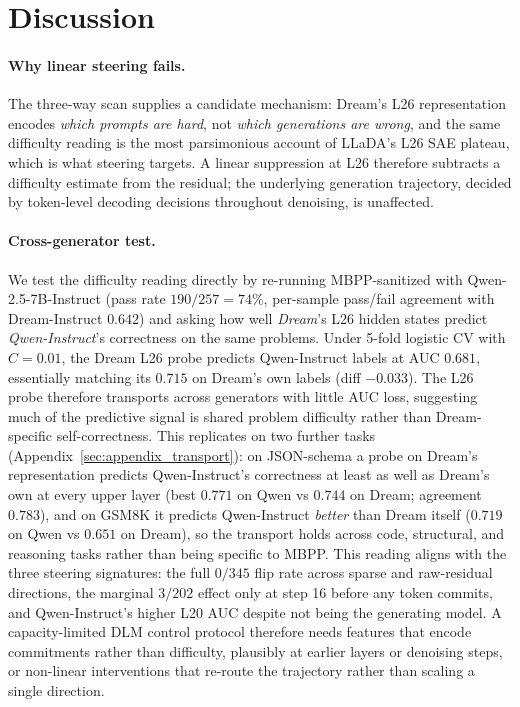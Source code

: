 \documentclass[11pt]{article}
\begin{document}
\section{Discussion}

\paragraph{Why linear steering fails.}
\label{sec:why_steer_fails}
The three-way scan supplies a candidate mechanism: Dream's L26 representation encodes \emph{which prompts are hard}, not \emph{which generations are wrong}, and the same difficulty reading is the most parsimonious account of LLaDA's L26 SAE plateau, which is what steering targets.
A linear suppression at L26 therefore subtracts a difficulty estimate from the residual; the underlying generation trajectory, decided by token-level decoding decisions throughout denoising, is unaffected.

\paragraph{Cross-generator test.}
\label{sec:cross_gen}
We test the difficulty reading directly by re-running MBPP-sanitized with Qwen-2.5-7B-Instruct (pass rate $190/257\!=\!74\%$, per-sample pass/fail agreement with Dream-Instruct $0.642$) and asking how well \emph{Dream}'s L26 hidden states predict \emph{Qwen-Instruct}'s correctness on the same problems.
Under 5-fold logistic CV with $C\!=\!0.01$, the Dream L26 probe predicts Qwen-Instruct labels at AUC $0.681$, essentially matching its $0.715$ on Dream's own labels (diff $-0.033$).
The L26 probe therefore transports across generators with little AUC loss, suggesting much of the predictive signal is shared problem difficulty rather than Dream-specific self-correctness.
This replicates on two further tasks (Appendix~\ref{sec:appendix_transport}): on JSON-schema a probe on Dream's representation predicts Qwen-Instruct's correctness at least as well as Dream's own at every upper layer (best $0.771$ on Qwen vs $0.744$ on Dream; agreement $0.783$), and on GSM8K it predicts Qwen-Instruct \emph{better} than Dream itself ($0.719$ on Qwen vs $0.651$ on Dream), so the transport holds across code, structural, and reasoning tasks rather than being specific to MBPP.
This reading aligns with the three steering signatures: the full $0/345$ flip rate across sparse and raw-residual directions, the marginal $3/202$ effect only at step 16 before any token commits, and Qwen-Instruct's higher L20 AUC despite not being the generating model.
A capacity-limited DLM control protocol therefore needs features that encode commitments rather than difficulty, plausibly at earlier layers or denoising steps, or non-linear interventions that re-route the trajectory rather than scaling a single direction.
\end{document}

